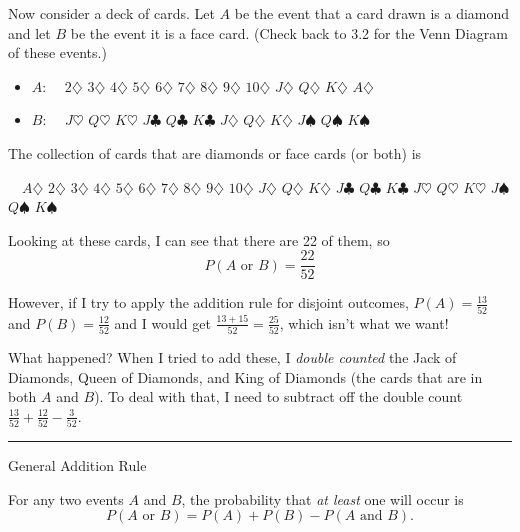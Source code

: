 \documentclass[
]{book}
\providecommand{\tightlist}{%
  \setlength{\itemsep}{0pt}\setlength{\parskip}{0pt}}
\begin{document}
Now consider a deck of cards. Let \(A\) be the event that a card drawn is a diamond and let \(B\) be the event it is a face card. (Check back to 3.2 for the Venn Diagram of these events.)

\begin{itemize}
\tightlist
\item
  \(A\): \(\quad 2\diamondsuit\) \(3\diamondsuit\) \(4\diamondsuit\) \(5\diamondsuit\) \(6\diamondsuit\) \(7\diamondsuit\) \(8\diamondsuit\) \(9\diamondsuit\) \(10\diamondsuit\) \(J\diamondsuit\) \(Q\diamondsuit\) \(K\diamondsuit\) \(A\diamondsuit\)
\item
  \(B\): \(\quad J\heartsuit\) \(Q\heartsuit\) \(K\heartsuit\) \(J\clubsuit\) \(Q\clubsuit\) \(K\clubsuit\) \(J\diamondsuit\) \(Q\diamondsuit\) \(K\diamondsuit\) \(J\spadesuit\) \(Q\spadesuit\) \(K\spadesuit\)
\end{itemize}

The collection of cards that are diamonds or face cards (or both) is

\(\quad A\diamondsuit\) \(2\diamondsuit\) \(3\diamondsuit\) \(4\diamondsuit\) \(5\diamondsuit\) \(6\diamondsuit\) \(7\diamondsuit\) \(8\diamondsuit\) \(9\diamondsuit\) \(10\diamondsuit\) \(J\diamondsuit\) \(Q\diamondsuit\) \(K\diamondsuit\) \(J\clubsuit\) \(Q\clubsuit\) \(K\clubsuit\) \(J\heartsuit\) \(Q\heartsuit\) \(K\heartsuit\) \(J\spadesuit\) \(Q\spadesuit\) \(K\spadesuit\)

Looking at these cards, I can see that there are 22 of them, so \[P(A \text{ or } B) = \frac{22}{52}\]

However, if I try to apply the addition rule for disjoint outcomes, \(P(A)=\frac{13}{52}\) and \(P(B)=\frac{12}{52}\) and I would get \(\frac{13+15}{52} = \frac{25}{52}\), which isn't what we want!

What happened? When I tried to add these, I \emph{double counted} the Jack of Diamonds, Queen of Diamonds, and King of Diamonds (the cards that are in both \(A\) and \(B\)). To deal with that, I need to subtract off the double count \(\frac{13}{52}+\frac{12}{52}-\frac{3}{52}\).

\begin{center}\rule{0.5\linewidth}{0.5pt}\end{center}

General Addition Rule

For any two events \(A\) and \(B\), the probability that \emph{at least} one will occur is \[P(A \text{ or } B) = P(A)+P(B)-P(A \text{ and }B).\]
\end{document}
